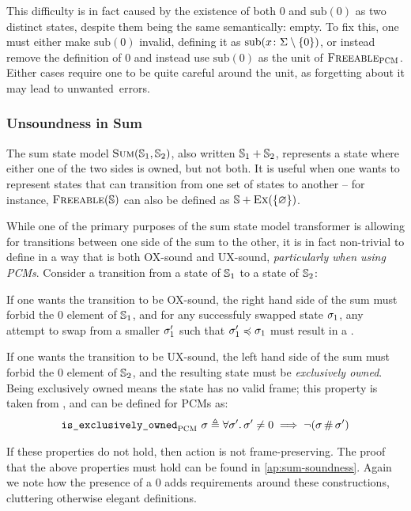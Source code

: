 This difficulty is in fact caused by the existence of both $0$ and $\text{sub}(0)$ as two distinct states, despite them being the same semantically: empty. To fix this, one must either make $\text{sub}(0)$ invalid, defining it as $\text{sub}(x\colon \Sigma \setminus \{0\})$, or instead remove the definition of $0$ and instead use $\text{sub}(0)$ as the unit of $\textsc{Freeable}_{\textsc{PCM}}$. Either cases require one to be quite careful around the unit, as forgetting about it may lead to unwanted~errors.

\subsubsection{Unsoundness in Sum}\label{sec:unsoundness-in-sum}

The sum state model $\textsc{Sum}(\mathbb S_1, \mathbb S_2)$, also written $\mathbb S_1 + \mathbb S_2$, represents a state where either one of the two sides is owned, but not both. It is useful when one wants to represent states that can transition from one set of states to another -- for instance, $\textsc{Freeable}(\mathbb S)$ can also be defined as $\mathbb S + \textsc{Ex}(\{\varnothing\})$.

While one of the primary purposes of the sum state model transformer is allowing for transitions between one side of the sum to the other, it is in fact non-trivial to define in a way that is both OX-sound and UX-sound, \emph{particularly when using PCMs}. Consider a transition from a state of $\mathbb S_1$ to a state of $\mathbb S_2$:
\begin{compactitem}
 \item If one wants the transition to be OX-sound, the right hand side of the sum must forbid the $0$ element of $\mathbb S_1$, and for any successfuly swapped state $\sigma_1$, any attempt to swap from a smaller $\sigma_1'$ such that $\sigma_1'\preccurlyeq\sigma_1$ must result in a \Miss.
 \item If one wants the transition to be UX-sound, the left hand side of the sum must forbid the $0$ element of $\mathbb S_2$, and the resulting state must be \emph{exclusively owned}. Being exclusively owned means the state has no valid frame; this property is taken from \cite{iris}, and can be defined for PCMs as: \begin{align*}
	\texttt{is\_exclusively\_owned}_{\textsc{PCM}}~\sigma \triangleq \forall \sigma'\ldotp \sigma'\neq 0\implies \neg(\sigma\operatorname{\#}\sigma')
\end{align*}
\end{compactitem}

If these properties do not hold, then action is not frame-preserving. The proof that the above properties must hold can be found in \cref{ap:sum-soundness}. Again we note how the presence of a $0$ adds requirements around these constructions, cluttering otherwise elegant definitions.

